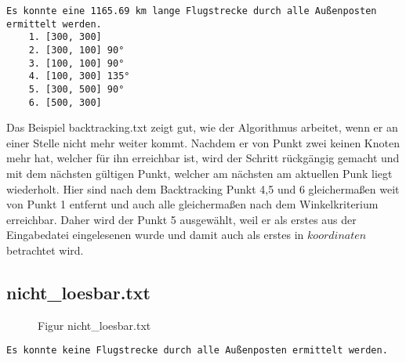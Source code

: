 \documentclass[a4paper,10pt,ngerman]{scrartcl}
\begin{document}
    \begin{lstlisting}[frame=single, title=Programmausgabe backtracking.txt, breaklines=true,label={lst:lstlisting13}]
    Es konnte eine 1165.69 km lange Flugstrecke durch alle Außenposten ermittelt werden.
    1. [300, 300]
    2. [300, 100] 90°
    3. [100, 100] 90°
    4. [100, 300] 135°
    5. [300, 500] 90°
    6. [500, 300]
    \end{lstlisting}

    Das Beispiel backtracking.txt zeigt gut, wie der Algorithmus arbeitet, wenn er an einer Stelle nicht mehr weiter kommt.
    Nachdem er von Punkt zwei keinen Knoten mehr hat, welcher für ihn erreichbar ist, wird der Schritt rückgängig gemacht
    und mit dem nächsten gültigen Punkt, welcher am nächsten am aktuellen Punk liegt wiederholt.
    Hier sind nach dem Backtracking Punkt 4,5 und 6 gleichermaßen weit von Punkt 1 entfernt
    und auch alle gleichermaßen nach dem Winkelkriterium erreichbar.
    Daher wird der Punkt 5 ausgewählt, weil er als erstes aus der Eingabedatei eingelesenen wurde und damit auch als erstes in $koordinaten$ betrachtet wird.
    \subsection{nicht\_loesbar.txt}\label{subsec:nichtloesbar.txt}

    \begin{figure}[H]
        \centering
        \caption{Figur nicht\_loesbar.txt}
        \label{fig:Figure4}
    \end{figure}

    \begin{lstlisting}[frame=single, title=Programmausgabe nicht\_loesbar.txt, breaklines=true,label={lst:lstlisting5}]
    Es konnte keine Flugstrecke durch alle Außenposten ermittelt werden.
    \end{lstlisting}
\end{document}
